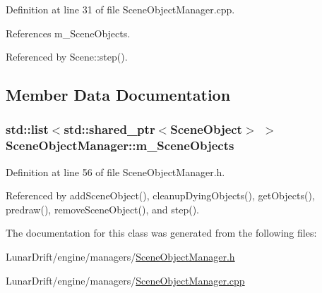 Definition at line 31 of file Scene\+Object\+Manager.\+cpp.



References m\+\_\+\+Scene\+Objects.



Referenced by Scene\+::step().



\subsection{Member Data Documentation}
\subsubsection[{\texorpdfstring{m\+\_\+\+Scene\+Objects}{m_SceneObjects}}]{\setlength{\rightskip}{0pt plus 5cm}std\+::list$<$std\+::shared\+\_\+ptr$<${\bf Scene\+Object}$>$ $>$ Scene\+Object\+Manager\+::m\+\_\+\+Scene\+Objects\hspace{0.3cm}{\ttfamily [private]}}\hypertarget{class_scene_object_manager_a3fec371160b895369edb7c694e205050}{}\label{class_scene_object_manager_a3fec371160b895369edb7c694e205050}


Definition at line 56 of file Scene\+Object\+Manager.\+h.



Referenced by add\+Scene\+Object(), cleanup\+Dying\+Objects(), get\+Objects(), predraw(), remove\+Scene\+Object(), and step().



The documentation for this class was generated from the following files\+:\begin{DoxyCompactItemize}
\item 
Lunar\+Drift/engine/managers/\hyperlink{_scene_object_manager_8h}{Scene\+Object\+Manager.\+h}\item 
Lunar\+Drift/engine/managers/\hyperlink{_scene_object_manager_8cpp}{Scene\+Object\+Manager.\+cpp}\end{DoxyCompactItemize}
